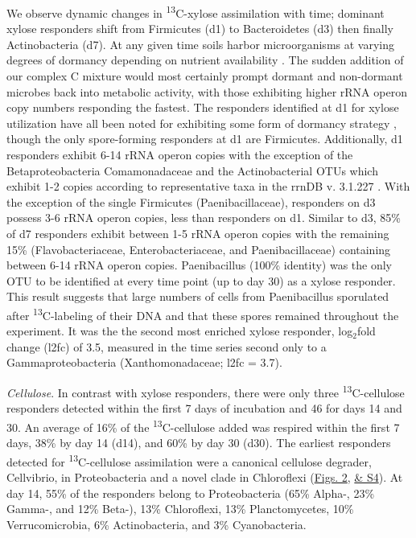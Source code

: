 We observe dynamic changes in \textsuperscript{13}C-xylose assimilation with time; dominant xylose responders shift from Firmicutes (d1) to Bacteroidetes (d3) then finally Actinobacteria (d7). At any given time soils harbor microorganisms at varying degrees of dormancy depending on nutrient availability \cite{Jones_2010}. The sudden addition of our complex C mixture would most certainly prompt dormant and non-dormant microbes back into metabolic activity, with those exhibiting higher rRNA operon copy numbers responding the fastest. The responders identified at d1 for xylose utilization have all been noted for exhibiting some form of dormancy strategy \cite{Jones_2010, Mulyukin_2009, Darcy_2011, Sachidanandham_2008, Finkel_2006, Rittershaus_2013, Tada_2013, Lay_2013}, though the only spore-forming responders at d1 are Firmicutes. Additionally, d1 responders exhibit 6-14 rRNA operon copies with the exception of the Betaproteobacteria Comamonadaceae and the Actinobacterial OTUs which exhibit 1-2 copies according to representative taxa in the rrnDB v. 3.1.227 \cite{18948294,11125085}. With the exception of the single Firmicutes (Paenibacillaceae), responders on d3 possess 3-6 rRNA operon copies, less than responders on d1. Similar to d3, 85\% of d7 responders exhibit between 1-5 rRNA operon copies with the remaining 15\% (Flavobacteriaceae, Enterobacteriaceae, and Paenibacillaceae) containing between 6-14 rRNA operon copies. Paenibacillus (100\% identity) was the only OTU to be identified at every time point (up to day 30) as a xylose responder. This result suggests that large numbers of cells from Paenibacillus sporulated after \textsuperscript{13}C-labeling of their DNA and that these spores remained throughout the experiment. It was the the second most enriched xylose responder, log\text$_{2}$fold change (l2fc) of 3.5, measured in the time series second only to a Gammaproteobacteria (Xanthomonadaceae; l2fc = 3.7).


\textit{Cellulose}. In contrast with xylose responders, there were only three \textsuperscript{13}C-cellulose responders detected within the first 7 days of incubation and 46 for days 14 and 30. An average of 16\% of the \textsuperscript{13}C-cellulose added was respired within the first 7 days, 38\% by day 14 (d14), and 60\% by day 30 (d30). The earliest responders detected for \textsuperscript{13}C-cellulose assimilation were a canonical cellulose degrader, Cellvibrio, in Proteobacteria and a novel clade in Chloroflexi (\href{https://www.authorea.com/users/3537/articles/3612/master/file/figures/l2fc_fig1/l2fc_fig.pdf}{Figs. 2}, \href{https://authorea.com/users/3537/articles/8459/master/file/figures/l2fc_fig_pVal/l2fc_fig_pVal.png}{& S4}). At day 14, 55\% of the responders belong to Proteobacteria (65\% Alpha-, 23\% Gamma-, and 12\% Beta-), 13\% Chloroflexi, 13\% Planctomycetes, 10\% Verrucomicrobia, 6\% Actinobacteria, and 3\% Cyanobacteria.

